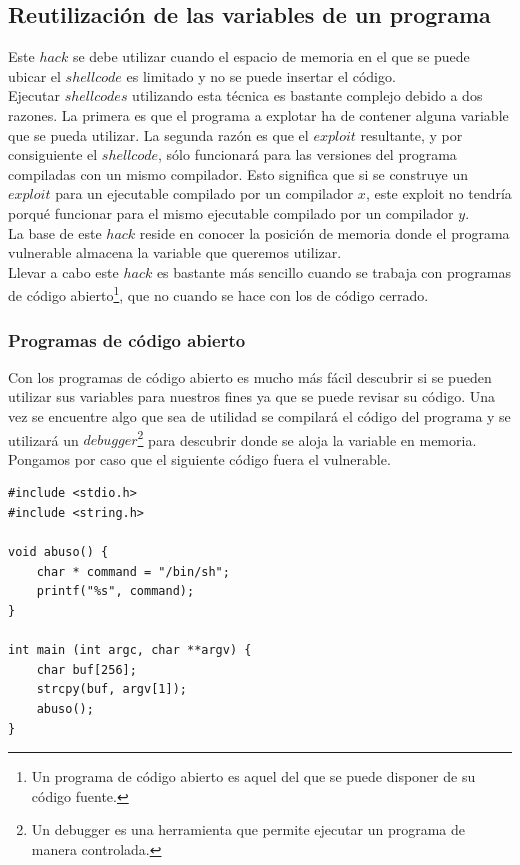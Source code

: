 \documentclass [titlepage, 12pt]{article}
\begin{document}
\subsection{Reutilizaci\'on de las variables de un programa}
Este $hack$ se debe utilizar cuando el espacio de memoria en el que se puede ubicar el $shellcode$ es limitado y no se puede insertar el c\'odigo.\\
Ejecutar $shellcodes$ utilizando esta t\'ecnica es bastante complejo debido a dos razones. La primera es que el programa a explotar ha de contener alguna variable que se pueda utilizar. La segunda raz\'on es que el $exploit$ resultante, y por consiguiente el $shellcode$, s\'olo funcionar\'a para las versiones del programa compiladas con un mismo compilador. Esto significa que si se construye un $exploit$ para un ejecutable compilado por un compilador $x$, este exploit no tendr\'ia porqu\'e funcionar para el mismo ejecutable compilado por un compilador $y$.\\
La base de este $hack$ reside en conocer la posici\'on de memoria donde el programa vulnerable almacena la variable que queremos utilizar.\\
Llevar a cabo este $hack$ es bastante m\'as sencillo cuando se trabaja con programas de c\'odigo abierto\footnote{Un programa de c\'odigo abierto es aquel del que se puede disponer de su c\'odigo fuente.}, que no cuando se hace con los de c\'odigo cerrado.

\subsubsection{Programas de c\'odigo abierto}

Con los programas de c\'odigo abierto es mucho m\'as f\'acil descubrir si se pueden utilizar sus variables para nuestros fines ya que se puede revisar su c\'odigo. Una vez se encuentre algo que sea de utilidad se compilar\'a el c\'odigo del programa y se utilizar\'a un $debugger$\footnote{Un debugger es una herramienta que permite ejecutar un programa de manera controlada.} para descubrir donde se aloja la variable en memoria.\bigskip
Pongamos por caso que el siguiente c\'odigo fuera el vulnerable.

\lstset{language=C++,caption=C\'odigo vulnerable}
\begin{lstlisting}
#include <stdio.h>
#include <string.h>

void abuso() {
	char * command = "/bin/sh";
	printf("%s", command); 
}

int main (int argc, char **argv) {
	char buf[256];
	strcpy(buf, argv[1]);
	abuso();
}
\end{lstlisting}
\end{document}
